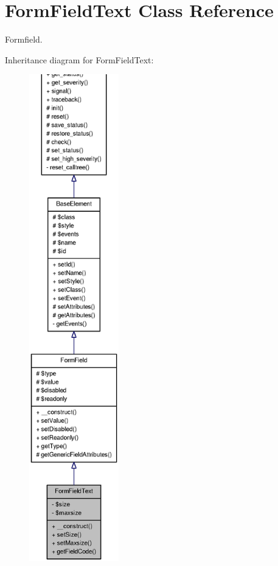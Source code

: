 \section{FormFieldText Class Reference}
\label{classFormFieldText}


Formfield.  




Inheritance diagram for FormFieldText:\nopagebreak
\begin{figure}[H]
\begin{center}
\leavevmode
\includegraphics[height=600pt]{classFormFieldText__inherit__graph}
\end{center}
\end{figure}



